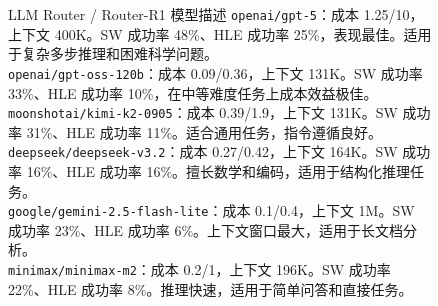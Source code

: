 \begin{figure}[!htbp]
\begin{paperbox}{LLM Router / Router-R1 模型描述}
\texttt{openai/gpt-5}：成本 1.25/10，上下文 400K。SW 成功率 48\%、HLE 成功率 25\%，表现最佳。适用于复杂多步推理和困难科学问题。 \\
\texttt{openai/gpt-oss-120b}：成本 0.09/0.36，上下文 131K。SW 成功率 33\%、HLE 成功率 10\%，在中等难度任务上成本效益极佳。 \\
\texttt{moonshotai/kimi-k2-0905}：成本 0.39/1.9，上下文 131K。SW 成功率 31\%、HLE 成功率 11\%。适合通用任务，指令遵循良好。 \\
\texttt{deepseek/deepseek-v3.2}：成本 0.27/0.42，上下文 164K。SW 成功率 16\%、HLE 成功率 16\%。擅长数学和编码，适用于结构化推理任务。 \\
\texttt{google/gemini-2.5-flash-lite}：成本 0.1/0.4，上下文 1M。SW 成功率 23\%、HLE 成功率 6\%。上下文窗口最大，适用于长文档分析。 \\
\texttt{minimax/minimax-m2}：成本 0.2/1，上下文 196K。SW 成功率 22\%、HLE 成功率 8\%。推理快速，适用于简单问答和直接任务。
\end{paperbox}
\end{figure}
